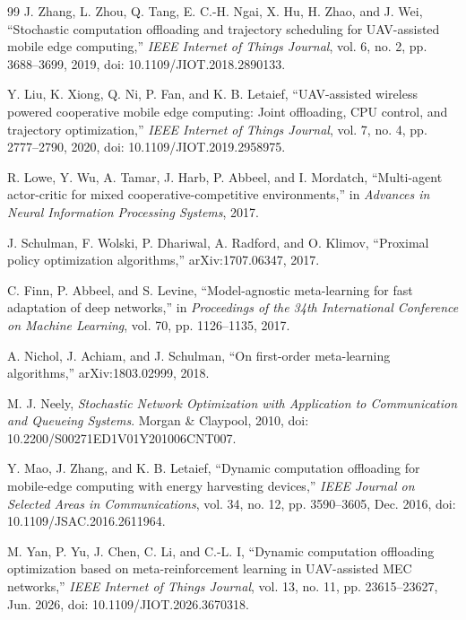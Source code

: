 \documentclass[journal]{IEEEtran}
\begin{document}
\begin{thebibliography}{99}
J. Zhang, L. Zhou, Q. Tang, E. C.-H. Ngai, X. Hu, H. Zhao, and J. Wei,
``Stochastic computation offloading and trajectory scheduling for UAV-assisted mobile edge computing,''
\emph{IEEE Internet of Things Journal}, vol. 6, no. 2, pp. 3688--3699,
2019, doi: 10.1109/JIOT.2018.2890133.

Y. Liu, K. Xiong, Q. Ni, P. Fan, and K. B. Letaief,
``UAV-assisted wireless powered cooperative mobile edge computing: Joint offloading, CPU control, and trajectory optimization,''
\emph{IEEE Internet of Things Journal}, vol. 7, no. 4, pp. 2777--2790,
2020, doi: 10.1109/JIOT.2019.2958975.

R. Lowe, Y. Wu, A. Tamar, J. Harb, P. Abbeel, and I. Mordatch,
``Multi-agent actor-critic for mixed cooperative-competitive environments,''
in \emph{Advances in Neural Information Processing Systems}, 2017.

J. Schulman, F. Wolski, P. Dhariwal, A. Radford, and O. Klimov,
``Proximal policy optimization algorithms,'' arXiv:1707.06347, 2017.

C. Finn, P. Abbeel, and S. Levine,
``Model-agnostic meta-learning for fast adaptation of deep networks,''
in \emph{Proceedings of the 34th International Conference on Machine Learning},
vol. 70, pp. 1126--1135, 2017.

A. Nichol, J. Achiam, and J. Schulman,
``On first-order meta-learning algorithms,'' arXiv:1803.02999, 2018.

M. J. Neely, \emph{Stochastic Network Optimization with Application to Communication and Queueing Systems}.
Morgan \& Claypool, 2010, doi: 10.2200/S00271ED1V01Y201006CNT007.

Y. Mao, J. Zhang, and K. B. Letaief,
``Dynamic computation offloading for mobile-edge computing with energy harvesting devices,''
\emph{IEEE Journal on Selected Areas in Communications}, vol. 34, no. 12,
pp. 3590--3605, Dec. 2016, doi: 10.1109/JSAC.2016.2611964.

M. Yan, P. Yu, J. Chen, C. Li, and C.-L. I,
``Dynamic computation offloading optimization based on meta-reinforcement learning in UAV-assisted MEC networks,''
\emph{IEEE Internet of Things Journal}, vol. 13, no. 11,
pp. 23615--23627, Jun. 2026, doi: 10.1109/JIOT.2026.3670318.


\end{thebibliography}
\end{document}
